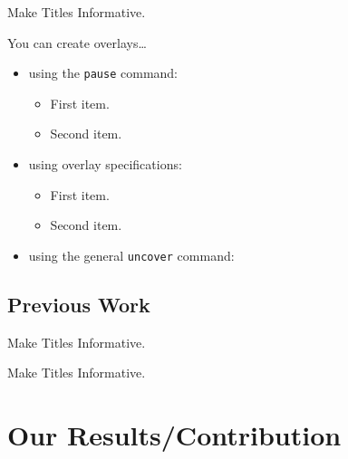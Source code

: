 \begin{frame}{Make Titles Informative.}

  You can create overlays\dots
  \begin{itemize}
  \item using the \texttt{pause} command:
    \begin{itemize}
    \item
      First item.
      \pause
    \item    
      Second item.
    \end{itemize}
  \item
    using overlay specifications:
    \begin{itemize}
    \item<3->
      First item.
    \item<4->
      Second item.
    \end{itemize}
  \item
    using the general \texttt{uncover} command:
    \begin{itemize}
    \end{itemize}
  \end{itemize}
\end{frame}


\subsection{Previous Work}

\begin{frame}{Make Titles Informative.}
\end{frame}

\begin{frame}{Make Titles Informative.}
\end{frame}



\section{Our Results/Contribution}

